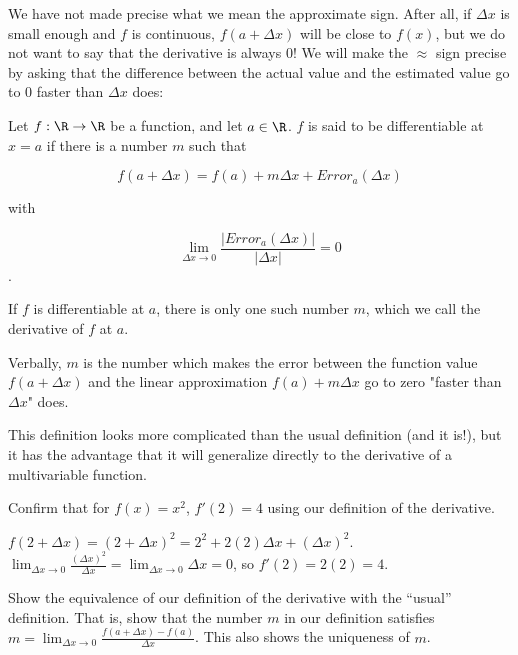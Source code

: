 \documentclass{ximera}
\begin{document}
	We have not made precise what we mean the approximate sign.  After all, if $\Delta x$ is small enough and $f$ is continuous, 
	$f(a+\Delta x)$ will be close to $f(x)$, but we do not want to say that the derivative is always $0$!  We will make the  $\approx$ sign precise by asking that the difference 
	between the actual value and the estimated value go to $0$ faster than $\Delta x$ does:
	
	\begin{definition}
		Let $f: \R \to \R$ be a function, and let $a \in \R$.  $f$ is said to be differentiable at $x=a$ if there is a number $m$ such that 
		
		\[ f(a+\Delta x) = f(a) + m\Delta x + Error_a(\Delta x)\]
		
		with
		
		\[ \lim_{\Delta x \to 0} \frac{\left|Error_a(\Delta x)|}{\left|\Delta x\right|} = 0 \].
		
		If $f$ is differentiable at $a$, there is only one such number $m$, which we call the derivative of $f$ at $a$.  
		
		Verbally,  $m$ is the number which makes the error between the function value $f(a+\Delta x)$ and the linear approximation $f(a)+m\Delta x$ go to zero 
		"faster than $\Delta x$" does.
	\end{definition}
	
	This definition looks more complicated than the usual definition (and it is!), but it has the advantage that it will 
	generalize directly to the derivative of a multivariable function.
	

	Confirm that for $f(x)=x^2$, $f'(2)=4$ using our definition of the derivative.
	
	\begin{free-response}
	 	$f(2+\Delta x) = (2+\Delta x)^2 = 2^2+2(2)\Delta x + (\Delta x)^2$.  $\lim_{\Delta x \to 0} \frac{(\Delta x)^2}{\Delta x} = \lim_{\Delta x \to 0} \Delta x = 0$, so 
	 	$f'(2) = 2(2) =4$.
	\end{free-response}

		Show the equivalence of our definition of the derivative with the ``usual'' definition.  That is, show that the number $m$ in our definition satisfies
		$m = \lim_{\Delta x \to 0}\frac{f(a+\Delta x)-f(a)}{\Delta x}$.  This also shows the uniqueness of $m$.
\end{document}
